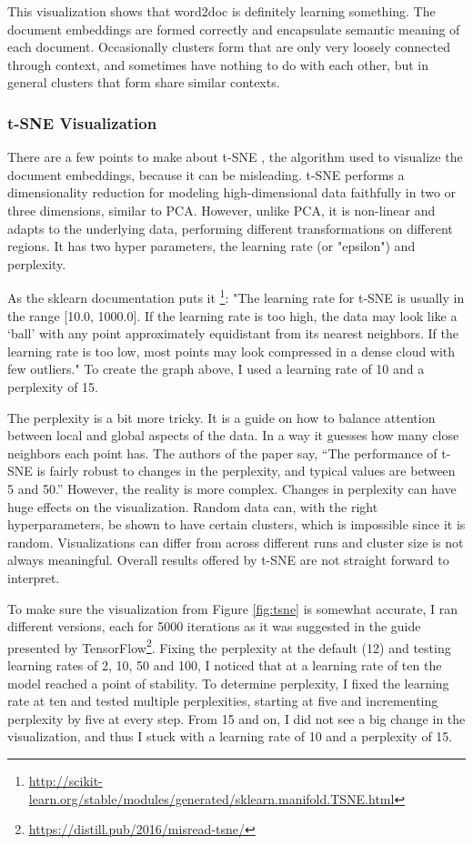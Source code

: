 This visualization shows that word2doc is definitely learning something. The document embeddings are formed correctly and
encapsulate semantic meaning of each document. Occasionally clusters form that are only very loosely connected through context, and
sometimes have nothing to do with each other, but in general clusters that form share similar contexts.


\subsubsection{t-SNE Visualization}

There are a few points to make about t-SNE \citep{tsne}, the algorithm used to visualize the document embeddings, because it can
be misleading. t-SNE performs a dimensionality reduction for modeling high-dimensional data faithfully in two or three dimensions,
similar to PCA. However, unlike PCA, it is non-linear and adapts to the underlying data, performing different transformations on
different regions. It has two hyper parameters, the learning rate (or "epsilon") and perplexity.

As the sklearn documentation puts it \footnote{\url{http://scikit-learn.org/stable/modules/generated/sklearn.manifold.TSNE.html}}:
"The learning rate for t-SNE is usually in the range [10.0, 1000.0]. If the learning rate is too
high, the data may look like a ‘ball’ with any point approximately equidistant from its nearest neighbors. If the learning
rate is too low, most points may look compressed in a dense cloud with few outliers." To create the graph above, I used a learning
rate of 10 and a perplexity of 15.

The perplexity is a bit more tricky. It is a guide on how to balance attention between local and global aspects of the data.
In a way it guesses how many close neighbors each point has. The authors of the paper say, “The performance of t-SNE is fairly robust to
changes in the perplexity, and typical values are between 5 and 50.” \citep{tsne} However, the reality is more complex. Changes in perplexity
can have huge effects on the visualization. Random data can, with the right hyperparameters, be shown to have certain clusters,
which is impossible since it is random. Visualizations can differ from across different runs and cluster size is not always
meaningful. Overall results offered by t-SNE are not straight forward to interpret.

To make sure the visualization from Figure \ref{fig:tsne} is somewhat accurate, I ran different versions, each for 5000 iterations as
it was suggested in the guide presented by TensorFlow\footnote{\url{https://distill.pub/2016/misread-tsne/}}.
Fixing the perplexity at the default (12) and testing learning rates of 2, 10, 50 and 100, I noticed that at a learning rate of
ten the model reached a point of stability. To determine perplexity, I fixed the learning rate at ten and tested multiple perplexities,
starting at five and incrementing perplexity by five at every step. From 15 and on, I did not see a big change in the visualization, and
thus I stuck with a learning rate of 10 and a perplexity of 15.


